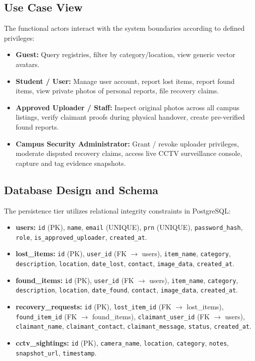 \documentclass[11pt,a4paper]{article}
\begin{document}
\subsection{Use Case View}
The functional actors interact with the system boundaries according to defined privileges:
\begin{itemize}
    \item \textbf{Guest:} Query registries, filter by category/location, view generic vector avatars.
    \item \textbf{Student / User:} Manage user account, report lost items, report found items, view private photos of personal reports, file recovery claims.
    \item \textbf{Approved Uploader / Staff:} Inspect original photos across all campus listings, verify claimant proofs during physical handover, create pre-verified found reports.
    \item \textbf{Campus Security Administrator:} Grant / revoke uploader privileges, moderate disputed recovery claims, access live CCTV surveillance console, capture and tag evidence snapshots.
\end{itemize}

\subsection{Database Design and Schema}
The persistence tier utilizes relational integrity constraints in PostgreSQL:
\begin{itemize}
    \item \textbf{users:} \texttt{id} (PK), \texttt{name}, \texttt{email} (UNIQUE), \texttt{prn} (UNIQUE), \texttt{password\_hash}, \texttt{role}, \texttt{is\_approved\_uploader}, \texttt{created\_at}.
    \item \textbf{lost\_items:} \texttt{id} (PK), \texttt{user\_id} (FK $\to$ users), \texttt{item\_name}, \texttt{category}, \texttt{description}, \texttt{location}, \texttt{date\_lost}, \texttt{contact}, \texttt{image\_data}, \texttt{created\_at}.
    \item \textbf{found\_items:} \texttt{id} (PK), \texttt{user\_id} (FK $\to$ users), \texttt{item\_name}, \texttt{category}, \texttt{description}, \texttt{location}, \texttt{date\_found}, \texttt{contact}, \texttt{image\_data}, \texttt{created\_at}.
    \item \textbf{recovery\_requests:} \texttt{id} (PK), \texttt{lost\_item\_id} (FK $\to$ lost\_items), \texttt{found\_item\_id} (FK $\to$ found\_items), \texttt{claimant\_user\_id} (FK $\to$ users), \texttt{claimant\_name}, \texttt{claimant\_contact}, \texttt{claimant\_message}, \texttt{status}, \texttt{created\_at}.
    \item \textbf{cctv\_sightings:} \texttt{id} (PK), \texttt{camera\_name}, \texttt{location}, \texttt{category}, \texttt{notes}, \texttt{snapshot\_url}, \texttt{timestamp}.
\end{itemize}
\end{document}
